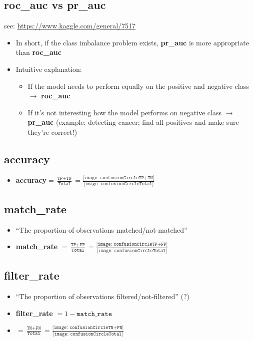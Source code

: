 \documentclass[12pt,a4paper]{article}
\begin{document}
\subsection{roc\_auc vs pr\_auc}
see: \url{https://www.kaggle.com/general/7517}
\begin{itemize}
\item In short, if the class imbalance problem exists, \textbf{pr\_auc} is more appropriate than \textbf{roc\_auc}
\item Intuitive explanation: 
\begin{itemize}
\item If the model needs to perform equally on the positive and negative class $\rightarrow$ \textbf{roc\_auc}
\item If it's not interesting how the model performs on negative class $\rightarrow$ \textbf{pr\_auc} (example: detecting cancer; find all positives and make sure they're correct!)
\end{itemize}
\end{itemize}
\subsection{accuracy}
\begin{itemize}
\item \textbf{accuracy}$= \frac{\texttt{TP}+\texttt{TN}}{\texttt{Total}} =\frac{\texttt{[image: confusionCircleTP+TN]}}{\texttt{[image: confusionCircleTotal]}}$
\end{itemize}
\subsection{match\_rate}
\begin{itemize}
\item ``The proportion of observations matched/not-matched''
\item \textbf{match\_rate} $=\frac{\texttt{TP}+\texttt{FP}}{\texttt{Total}}=\frac{\texttt{[image: confusionCircleTP+FP]}}{\texttt{[image: confusionCircleTotal]}}$
\end{itemize}
\subsection{filter\_rate}
\begin{itemize}
\item ``The proportion of observations filtered/not-filtered'' (?)
\item \textbf{filter\_rate} $=1-\texttt{match\_rate}$
\item $=\frac{\texttt{TN}+\texttt{FN}}{\texttt{Total}} = \frac{\texttt{[image: confusionCircleTN+FN]}}{\texttt{[image: confusionCircleTotal]}}$
\end{itemize}
\end{document}
